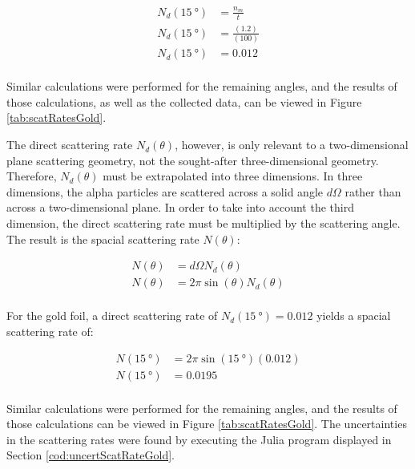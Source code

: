 \documentclass[a4paper]{article}
\begin{document}
\begin{align*}
  N_d (\SI{15}{\degree}) &= \frac{n_m}{t} \\
  N_d (\SI{15}{\degree}) &= \frac{(1.2)}{(100)} \\
  N_d (\SI{15}{\degree}) &= \num{0.012} \\
\end{align*}

Similar calculations were performed for the remaining angles, and the results of
those calculations, as well as the collected data, can be viewed in Figure
\ref{tab:scatRatesGold}.

\qq The direct scattering rate \( N_d (\theta) \), however, is only relevant to
a two-dimensional plane scattering geometry, not the sought-after
three-dimensional geometry. Therefore, \( N_d (\theta) \) must be extrapolated
into three dimensions. In three dimensions, the alpha particles are scattered
across a solid angle \( d\Omega \) rather than across a two-dimensional
plane. In order to take into account the third dimension, the direct scattering
rate must be multiplied by the scattering angle. The result is the spacial
scattering rate \( N (\theta) \):

\begin{align*}
  N (\theta) &= d\Omega N_d (\theta) \\
  N (\theta) &= 2 \pi \sin{(\theta)} N_d (\theta) \\
\end{align*}

\qq For the gold foil, a direct scattering rate of \( N_d (\SI{15}{\degree}) =
\num{0.012} \) yields a spacial scattering rate of:

\begin{align*}
  N (\SI{15}{\degree}) &= 2 \pi \sin{(\SI{15}{\degree})} (\num{0.012}) \\
  N (\SI{15}{\degree}) &= \num{0.0195} \\
\end{align*}

Similar calculations were performed for the remaining angles, and the results of
those calculations can be viewed in Figure \ref{tab:scatRatesGold}. The
uncertainties in the scattering rates were found by executing the Julia program
displayed in Section \ref{cod:uncertScatRateGold}.
\end{document}
